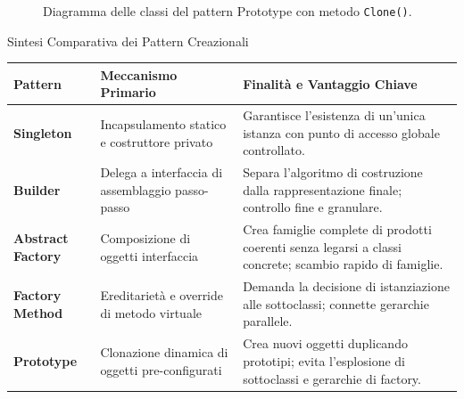 \documentclass[12pt]{extarticle}
\newcommand{\cn}[1]{\makebox[\linewidth][c]{\textbf{#1}}}
\begin{document}
\begin{figure}[htbp]
\centering
{}
\caption{Diagramma delle classi del pattern Prototype con metodo \texttt{Clone()}.}
\label{fig:pattern_prototype}
\end{figure}

\begin{cbox}{Sintesi Comparativa dei Pattern Creazionali}
\begin{center}
\small
\begin{tabular}{p{3.2cm}p{4.2cm}p{6.4cm}}
    \toprule
    \textbf{Pattern} & \textbf{Meccanismo Primario} & \textbf{Finalità e Vantaggio Chiave} \\
    \midrule
    \textbf{Singleton} & Incapsulamento statico e costruttore privato & Garantisce l'esistenza di un'unica istanza con punto di accesso globale controllato. \\
    \addlinespace
    \textbf{Builder} & Delega a interfaccia di assemblaggio passo-passo & Separa l'algoritmo di costruzione dalla rappresentazione finale; controllo fine e granulare. \\
    \addlinespace
    \textbf{Abstract Factory} & Composizione di oggetti interfaccia & Crea famiglie complete di prodotti coerenti senza legarsi a classi concrete; scambio rapido di famiglie. \\
    \addlinespace
    \textbf{Factory Method} & Ereditarietà e override di metodo virtuale & Demanda la decisione di istanziazione alle sottoclassi; connette gerarchie parallele. \\
    \addlinespace
    \textbf{Prototype} & Clonazione dinamica di oggetti pre-configurati & Crea nuovi oggetti duplicando prototipi; evita l'esplosione di sottoclassi e gerarchie di factory. \\
    \bottomrule
\end{tabular}
\end{center}
\end{cbox}
\end{document}
